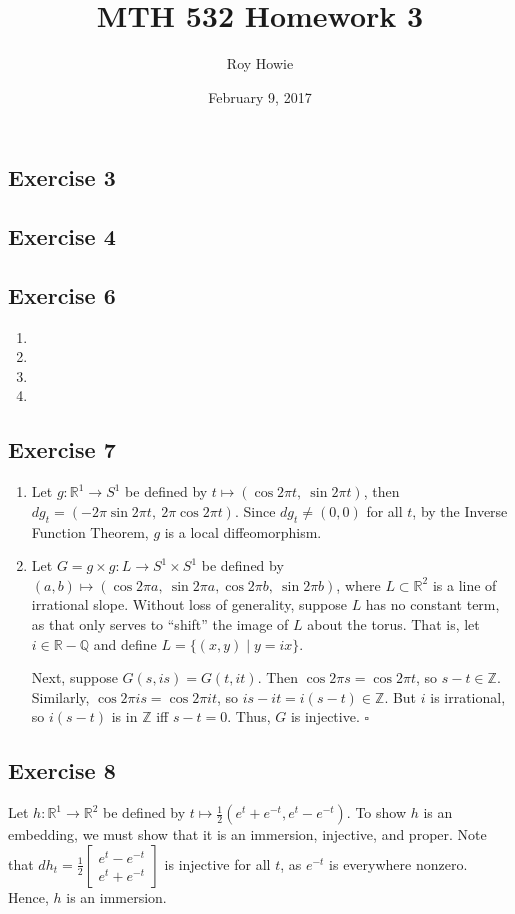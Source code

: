 \documentclass{article}
\begin{document}
\title{MTH 532 Homework 3}
\author{Roy Howie}
\date{February 9, 2017}
\maketitle

\subsection*{Exercise 3}
\subsection*{Exercise 4}
\subsection*{Exercise 6}
\begin{enumerate}[label=(\alph*)]
\item{}
\item{}
\item{}
\item{}
\end{enumerate}

\subsection*{Exercise 7}
\begin{enumerate}[label=(\alph*)]
\item{
	Let $g\colon\mathbb{R}^1\to S^1$ be defined by
	$t\mapsto(\cos2\pi t,\ \sin2\pi t)$, then
	$dg_t = (-2\pi\sin2\pi t,\ 2\pi\cos2\pi t)$.
	Since $dg_t\ne(0,0)$ for all $t$, by the
	Inverse Function Theorem, $g$ is a local
	diffeomorphism.
}
\item{
	Let $G=g\times g\colon L\to S^1\times S^1$
	be defined by $(a,b)\mapsto(\cos2\pi a,\ \sin2\pi a,
	\cos2\pi b,\ \sin2\pi b)$, where $L\subset\mathbb{R}^2$
	is a line of irrational slope. Without loss of generality,
	suppose $L$ has no constant term, as that only serves to ``shift''
	the image of $L$ about the torus. That is, let $i\in\mathbb{R}-\mathbb{Q}$
	and define $L=\{(x,y)\mid y=ix\}$.
	
	Next, suppose $G(s,is)=G(t,it)$. Then $\cos2\pi s=\cos2\pi t$,
	so $s-t\in\mathbb{Z}$. Similarly, $\cos2\pi is=\cos2\pi it$,
	so $is-it=i(s-t)\in\mathbb{Z}$. But $i$ is irrational, so
	$i(s-t)$ is in $\mathbb{Z}$ iff $s-t=0$. Thus, $G$ is injective.
	\hfill $\square$
}
\end{enumerate}

\subsection*{Exercise 8}
Let $h\colon\mathbb{R}^1\to\mathbb{R}^2$ be defined by
$t\mapsto\frac{1}{2}(e^t+e^{-t},e^t-e^{-t})$.
To show $h$ is an embedding, we must show that it is
an immersion, injective, and proper. Note that
$dh_t= \frac{1}{2}
\left[
	\begin{smallmatrix}
		e^t-e^{-t}\\
		e^t+e^{-t}
	\end{smallmatrix}
\right]$
is injective for all $t$, as $e^{-t}$ is everywhere nonzero.
Hence, $h$ is an immersion.
\end{document}
